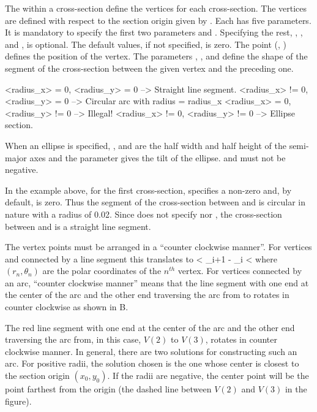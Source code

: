 The  within a cross-section define the vertices for each
cross-section. The vertices are defined with respect to the section
origin given by . Each  has five
parameters. It is mandatory to specify the first two parameters
 and . Specifying the rest, ,
, and , is optional. The default values, if
not specified, is zero. The point (, ) defines the
position of the vertex. The parameters ,
, and  define the shape of the segment of
the cross-section between the given vertex and the preceding one.
\begin{example}
  <radius_x>  = 0, <radius_y>  = 0   --> Straight line segment.
  <radius_x> != 0, <radius_y>  = 0   --> Circular arc with radius = radius_x
  <radius_x>  = 0, <radius_y> != 0   --> Illegal!
  <radius_x> != 0, <radius_y> != 0   --> Ellipse section.
\end{example}
When an ellipse is specified, , and  are
the half width and half height of the semi-major axes and the
 parameter gives the tilt of the ellipse. 
and  must not be negative.

In the example above, for the first cross-section, 
specifies a non-zero  and, by default, 
is zero. Thus the segment of the cross-section between  and
 is circular in nature with a radius of 0.02. Since 
does not specify  nor , the
cross-section between  and  is a straight line
segment.

The vertex points must be arranged in a ``counter clockwise manner''. 
For vertices  and  connected by a line segment
this translates to
 < \theta_{i+1} - \theta_{i} \pmod{2\pi} < \pi
\Endeq
where $(r_n, \theta_n)$ are the polar coordinates of the $n^{th}$
vertex. For vertices connected by an arc, ``counter clockwise manner''
means that the line segment with one end at the center of the arc and
the other end traversing the arc from  to 
rotates in counter clockwise as shown in
B. 

The red line segment with one end at the center of the arc and the
other end traversing the arc from, in this case, $V(2)$ to $V(3)$,
rotates in counter clockwise manner. In general, there are two
solutions for constructing such an arc. For positive radii, the
solution chosen is the one whose center is closest to the section
origin $(x_0, y_0)$. If the radii are negative, the center point will
be the point farthest from the origin (the dashed line between $V(2)$
and $V(3)$ in the figure).

